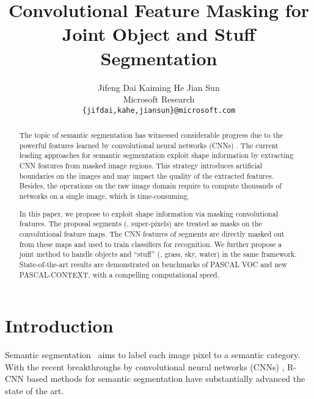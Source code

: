\documentclass[10pt,twocolumn,letterpaper]{article}
\begin{document}
\title{Convolutional Feature Masking for Joint Object and Stuff Segmentation}

\author{Jifeng Dai \qquad\qquad Kaiming He \qquad\qquad Jian Sun \vspace{8pt}\\
Microsoft Research\\
{\tt\small \{jifdai,kahe,jiansun\}@microsoft.com}
}

\maketitle


\begin{abstract}

The topic of semantic segmentation has witnessed considerable progress due to the powerful features learned by convolutional neural networks (CNNs) \cite{krizhevsky2012imagenet}. The current leading approaches for semantic segmentation exploit shape information by extracting CNN features from masked image regions. This strategy introduces artificial boundaries on the images and may impact the quality of the extracted features. Besides, the operations on the raw image domain require to compute thousands of networks on a single image, which is time-consuming.

In this paper, we propose to exploit shape information via masking convolutional features. The proposal segments (\eg, super-pixels) are treated as masks on the convolutional feature maps. The CNN features of segments are directly masked out from these maps and used to train classifiers for recognition. We further propose a joint method to handle objects and ``stuff'' (\eg, grass, sky, water) in the same framework. State-of-the-art results are demonstrated on benchmarks of PASCAL VOC and new PASCAL-CONTEXT, with a compelling computational speed.
\end{abstract}

\section{Introduction}

Semantic segmentation~\cite{kumar2005obj,JamieECCV06TextonBoost,yang2010layered,brox2011object} aims to label each image pixel to a semantic category. With the recent breakthroughs \cite{krizhevsky2012imagenet} by convolutional neural networks (CNNs) \cite{lecun1989backpropagation}, R-CNN based methods \cite{girshick2013rich,hariharan2014simultaneous} for semantic segmentation have substantially advanced the state of the art.
\end{document}
